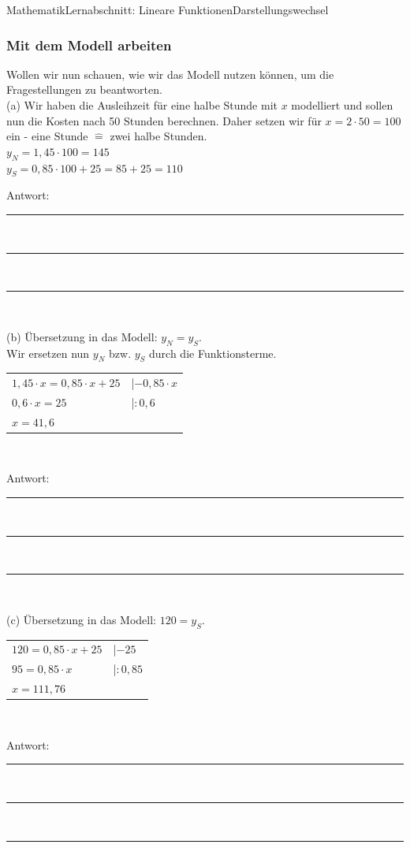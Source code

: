 \documentclass[11pt,twocolumn,oneside,openany,headings=optiontotoc,11pt,numbers=noenddot]{article}
\begin{document}
\begin{worksheet}{Mathematik}{Lernabschnitt: Lineare Funktionen}{Darstellungswechsel}
		\subsubsection{Mit dem Modell arbeiten}
		Wollen wir nun schauen, wie wir das Modell nutzen können, um die Fragestellungen zu beantworten.\\
		(a) Wir haben die Ausleihzeit für eine halbe Stunde mit \(x\) modelliert und sollen nun die Kosten nach 50 Stunden berechnen. Daher setzen wir für \(x = 2\cdot{}50 = 100\) ein - eine Stunde \(\widehat{=}\) zwei halbe Stunden.\\
		\(y_N = 1,45\cdot{}100 = 145\)\\
		\(y_S = 0,85\cdot{}100 + 25 = 85+25 = 110\)\\
		\par\noindent
		Antwort: \rule{0.36\textwidth}{0.1pt}\\
		\par\bigskip\noindent
		\rule{0.45\textwidth}{0.1pt}\\
		\par\bigskip\noindent
		\rule{0.45\textwidth}{0.1pt}\\
		\par\noindent
		(b) Übersetzung in das Modell: \(y_N = y_S\).\\
		Wir ersetzen nun \(y_N\) bzw. \(y_S\) durch die Funktionsterme.\\
		\begin{tabularx}{0.5\textwidth}{ll}
			\(1,45\cdot{}x = 0,85\cdot{}x + 25\) & |\(-0,85\cdot{}x\)\\
			\(0,6\cdot{}x = 25\) & |\(:0,6\)\\
			\(x = 41,6\)
		\end{tabularx}\\
		\par\noindent
		Antwort: \rule{0.36\textwidth}{0.1pt}\\
		\par\bigskip\noindent
		\rule{0.45\textwidth}{0.1pt}\\
		\par\bigskip\noindent
		\rule{0.45\textwidth}{0.1pt}\\
		\par\noindent
		(c) Übersetzung in das Modell: \(120 = y_S\).\\
		\begin{tabularx}{0.5\textwidth}{ll}
			\(120 = 0,85\cdot{}x + 25\) & |\(-25\)\\
			\(95 = 0,85\cdot{}x\) & |\(:0,85\)\\
			\(x = 111,76\)
		\end{tabularx}\\
		\par\noindent
		Antwort: \rule{0.36\textwidth}{0.1pt}\\
		\par\bigskip\noindent
		\rule{0.45\textwidth}{0.1pt}\\
		\par\bigskip\noindent
		\rule{0.45\textwidth}{0.1pt}\\
		\par\noindent
	\end{worksheet}
\end{document}

